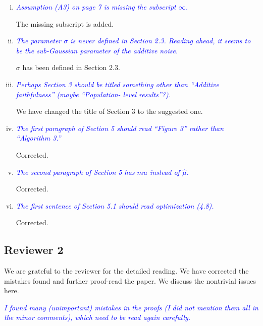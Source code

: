 \documentclass[pdftex,12pt]{article}
\let\hat\widehat
\def\rc#1{{\it\textcolor{blue}{#1}}\smallskip}
\begin{document}
\begin{enumerate}[(1)]
\begin{enumerate}[(i)]
\item \rc{Assumption (A3) on page 7 is missing the subscript $\infty$.}

The missing subscript is added.

\item \rc{The parameter $\sigma$ is never defined in Section 2.3. Reading ahead,
it seems to be the sub-Gaussian parameter of the additive noise.}

$\sigma$ has been defined in Section 2.3.

\item \rc{Perhaps Section 3 should be titled something other than ``Additive
faithfulness'' (maybe ``Population- level results''?).}

We have changed the title of Section 3 to the suggested one.

\item \rc{The first paragraph of Section 5 should read
  ``Figure 3'' rather than ``Algorithm 3.''}

Corrected.

\item \rc{The second paragraph of Section 5 has $m\hat{}u$ instead of $\hat\mu$.}

Corrected.

\item \rc{The first sentence of Section 5.1 should read optimization (4.8).}

Corrected.

\end{enumerate}

\end{enumerate}

\subsection*{Reviewer 2}


We are grateful to the reviewer for the detailed reading. We have corrected the mistakes found and further proof-read the paper. We discuss the nontrivial issues here.  

\rc{I found many (unimportant) mistakes in the proofs (I
  did not mention them all in the minor comments), which need to be
  read again carefully.}
\end{document}
